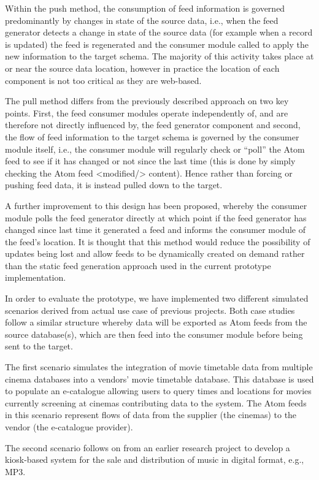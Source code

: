 \documentclass{CRPITStyle}
\begin{document}
Within the push method, the consumption of feed information is governed
predominantly by changes in state of the source data, i.e., when the feed
generator detects a change in state of the source data (for example when
a record is updated) the feed is regenerated and the consumer module
called to apply the new information to the target schema. The majority
of this activity takes place at or near the source data location,
however in practice the location of each component is not too critical as
they are web-based.

The pull method differs from the previously described approach on two
key points. First, the feed consumer modules operate independently of,
and are therefore not directly influenced by, the feed generator
component and second, the flow of feed information to the target schema
is governed by the consumer module itself, i.e., the consumer module
will regularly check or ``poll'' the Atom feed to see if it has changed
or not since the last time (this is done by simply checking the Atom
feed <modified/> content). Hence rather than forcing or pushing feed
data, it is instead pulled down to the target.

A further improvement to this design has been proposed, whereby the
consumer module polls the feed generator directly at which point if the
feed generator has changed since last time it generated a feed and
informs the consumer module of the feed's location. It is thought that
this method would reduce the possibility of updates being lost and allow
feeds to be dynamically created on demand rather than the static
feed generation approach used in the current prototype implementation.

In order to evaluate the prototype, we have implemented two different
simulated scenarios derived from actual use case of previous projects.
Both case studies follow a similar structure whereby data will be
exported as Atom feeds from the source database(s), which are then feed
into the consumer module before being sent to the target.

The first scenario simulates the integration of movie timetable data
from multiple cinema databases into a vendors' movie timetable database.
This database is used to populate an e-catalogue allowing users to query
times and locations for movies currently screening at cinemas
contributing data to the system. The Atom feeds in this scenario
represent flows of data from the supplier (the cinemas) to the vendor
(the e-catalogue provider).

The second scenario follows on from an earlier research project to
develop a kiosk-based system for the sale and distribution of music in
digital format, e.g., MP3.
\end{document}
